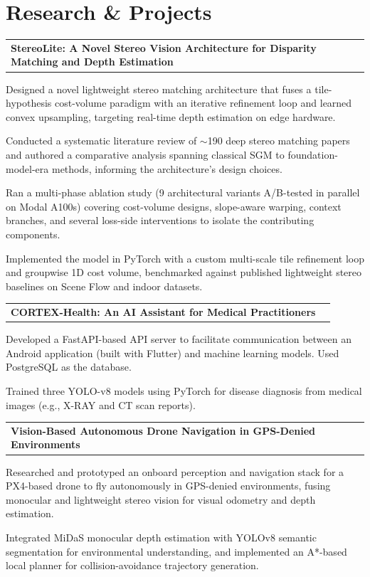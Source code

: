 \documentclass[letterpaper,11pt]{article}
\makeatletter
\newcommand{\resumeSubheadingSpacer}{\item\vspace{2pt}}
\newcommand{\resumeItem}[1]{\item\small #1}
\newcommand{\resumeProjectHeading}[2]{
    \item
    \begin{tabularx}{0.97\textwidth}{l@{\extracolsep{\fill}}r}
      \textbf{#1} & \textit{#2}
    \end{tabularx}
}
\makeatother
\begin{document}
\section{Research \& Projects}
\begin{resumeSubHeadingList}
    \resumeProjectHeading
        {\textbf{StereoLite: A Novel Stereo Vision Architecture for Disparity Matching and Depth Estimation}}{}
        \begin{resumeItemList}
            \resumeItem{Designed a novel lightweight stereo matching architecture that fuses a tile-hypothesis cost-volume paradigm with an iterative refinement loop and learned convex upsampling, targeting real-time depth estimation on edge hardware.}
            \resumeItem{Conducted a systematic literature review of $\sim$190 deep stereo matching papers and authored a comparative analysis spanning classical SGM to foundation-model-era methods, informing the architecture's design choices.}
            \resumeItem{Ran a multi-phase ablation study (9 architectural variants A/B-tested in parallel on Modal A100s) covering cost-volume designs, slope-aware warping, context branches, and several loss-side interventions to isolate the contributing components.}
            \resumeItem{Implemented the model in PyTorch with a custom multi-scale tile refinement loop and groupwise 1D cost volume, benchmarked against published lightweight stereo baselines on Scene Flow and indoor datasets.}
        \end{resumeItemList}
    \resumeSubheadingSpacer
    \newpage
    \resumeProjectHeading
        {\textbf{CORTEX-Health: An AI Assistant for Medical Practitioners}}{}
        \begin{resumeItemList}
        \resumeItem{Developed a FastAPI-based API server to facilitate communication between an Android application (built with Flutter) and machine learning models. Used PostgreSQL as the database.}
        \resumeItem{Trained three YOLO-v8 models using PyTorch for disease diagnosis from medical images (e.g., X-RAY and CT scan reports).}
        \end{resumeItemList}
    \resumeProjectHeading
        {\textbf{Vision-Based Autonomous Drone Navigation in GPS-Denied Environments}}{}
        \begin{resumeItemList}
            \resumeItem{Researched and prototyped an onboard perception and navigation stack for a PX4-based drone to fly autonomously in GPS-denied environments, fusing monocular and lightweight stereo vision for visual odometry and depth estimation.}
            \resumeItem{Integrated MiDaS monocular depth estimation with YOLOv8 semantic segmentation for environmental understanding, and implemented an A*-based local planner for collision-avoidance trajectory generation.}

\end{resumeItemList}
\end{resumeSubHeadingList}
\end{document}
